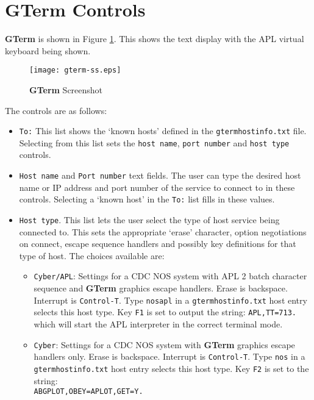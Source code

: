 \documentclass[a4paper,twoside,11pt]{article}
\makeatletter
\def\maxwidth{%
  \ifdim\Gin@nat@width>\linewidth
    \linewidth
  \else
    \Gin@nat@width
  \fi
}
\makeatother
\begin{document}
\section{\textbf{GTerm} Controls}\label{useit}
\textbf{GTerm} is shown in Figure \ref{fig:gtermss}. This shows the text display with the APL virtual keyboard being
shown. 
\begin{figure}
	\centering
		\texttt{[image: gterm-ss.eps]}
	\caption{\textbf{GTerm} Screenshot}
	\label{fig:gtermss}
\end{figure}
The controls are as follows:
\begin{itemize}
\item \texttt{To:} This list shows the `known hosts' defined in the \texttt{gtermhostinfo.txt} file. Selecting
      from this list sets the \texttt{host name}, \texttt{port number} and \texttt{host type} controls.
\item \texttt{Host name} and \texttt{Port number} text fields. The user can type the desired host name or IP address and
      port number of the service to connect to in these controls. Selecting a `known host' in the \texttt{To:} list
      fills in these values.
\item \texttt{Host type}. This list lets the user select the type of host service being connected to. This sets the
      appropriate `erase' character, option negotiations on connect, escape sequence handlers and possibly
      key definitions for that type of host. The choices available are:
      \begin{itemize}
      \item \texttt{Cyber/APL}: Settings for a CDC NOS system with APL 2 batch character sequence and \textbf{GTerm}
            graphics escape handlers. Erase is backspace. Interrupt is \texttt{Control-T}. Type \texttt{nosapl} in
            a \texttt{gtermhostinfo.txt} host entry selects this host type. Key \texttt{F1} is set to output the
            string: \texttt{APL,TT=713.} which will start the APL interpreter in the correct terminal mode.
      \item \texttt{Cyber}: Settings for a CDC NOS system with \textbf{GTerm}
            graphics escape handlers only.
            Erase is backspace. Interrupt is \texttt{Control-T}. Type \texttt{nos} in
            a \texttt{gtermhostinfo.txt} host entry selects this host type.
            Key \texttt{F2} is set to the string: \\
            \texttt{ABGPLOT,OBEY=APLOT,GET=Y.} \\

\end{itemize}
\end{itemize}
\end{document}
